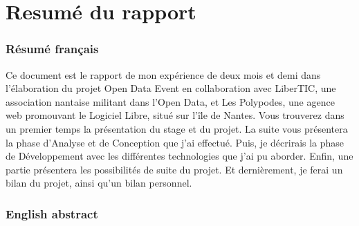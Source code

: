 \part*{Resumé du rapport}

\section*{Résumé français}

Ce document est le rapport de mon expérience de deux mois et demi dans l'élaboration du projet Open Data Event en collaboration avec LiberTIC, une association nantaise militant dans l'Open Data, et Les Polypodes, une agence web promouvant le Logiciel Libre, situé sur l'île de Nantes. Vous trouverez dans un premier temps la présentation du stage et du projet. La suite vous présentera la phase d'Analyse et de Conception que j'ai effectué. Puis, je décrirais la phase de Développement avec les différentes technologies que j'ai pu aborder. Enfin, une partie présentera les possibilités de suite du projet. Et dernièrement, je ferai un bilan du projet, ainsi qu'un bilan personnel.

\section*{English abstract}